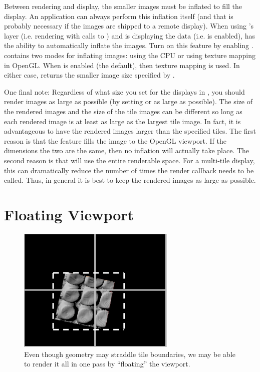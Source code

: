 Between rendering and display, the smaller images must be inflated to fill
the display.  An application can always perform this inflation itself (and
that is probably necessary if the images are shipped to a remote display).
When using \IceT's \OpenGL layer (i.e. rendering with calls to
) and \IceT is displaying the data
(i.e.  is enabled), \IceT has the ability to
automatically inflate the images.  Turn on this feature by enabling
.  \IceT contains two modes for inflating
images: using the CPU or using texture mapping in OpenGL.  When
 is enabled (the
default), then texture mapping is used.  In either case,
 returns the smaller image size specified by
.

One final note: Regardless of what size you set for the displays in
, you should render images as large as possible (by
setting  or  as
large as possible).  The size of the rendered images and the size of the
tile images can be different so long as each rendered image is at least as
large as the largest tile image.  In fact, it is advantageous to have the
rendered images larger than the specified tiles.  The first reason is that
the  feature fills the image to the
OpenGL viewport.  If the dimensions the two are the same, then no inflation
will actually take place.  The second reason is that \IceT will use the
entire renderable space.  For a multi-tile display, this can dramatically
reduce the number of times the render callback needs to be called.  Thus,
in general it is best to keep the rendered images as large as possible.


\section{Floating Viewport}
\label{sec:Customizing_Compositing:Floating_Viewport}

\begin{figure}
  \centering
  \includegraphics[width=3in]{images/FloatingViewport}
  \caption[Floating viewport.]{Even though geometry may straddle tile
    boundaries, we may be able to render it all in one pass by ``floating''
    the viewport.}
  \label{fig:FloatingViewport}
\end{figure}

